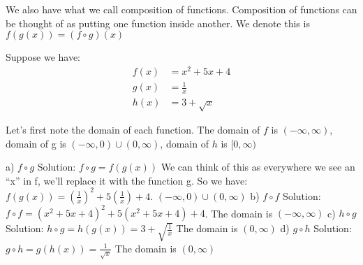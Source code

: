 \documentclass{ximera}
\begin{document}
We also have what we call composition of functions.  Composition of
functions can be thought of as putting one function inside another.
We denote this is $f(g(x))=(f\circ g)(x)$

\begin{example}
 Suppose we have:
\begin{align*}
  f(x)&={{x}^{2}}+5x+4 \\ 
  g(x)&=\frac{1}{x} \\ 
  h(x)&=3+\sqrt{x}
\end{align*}

Let’s first note the domain of each function.  The domain of $f$
is $(-\infty ,\infty )$, domain of g is $(-\infty ,0)\cup (0,\infty )$,
domain of $h$ is $[0,\infty )$
 
a)	$f\circ g$ 
Solution: $f\circ g=f(g(x))$ We can think of this as everywhere we see an “x” in f, we’ll replace it with the function g. So we have: $f(g(x))={{\left( \frac{1}{x} \right)}^{2}}+5\left( \frac{1}{x} \right)+4$.  $(-\infty ,0)\cup (0,\infty )$
b)	$f\circ f$ 
Solution: $f\circ f={{\left( {{x}^{2}}+5x+4 \right)}^{2}}+5\left( {{x}^{2}}+5x+4 \right)+4$.  The domain is $(-\infty ,\infty )$
c)	$h\circ g$  
Solution: $h\circ g=h(g(x))=3+\sqrt{\frac{1}{x}}$ The domain is $(0,\infty )$
d)	$g\circ h$ 
Solution:$g\circ h=g(h(x))=\frac{1}{\sqrt{x}}$ The domain is $(0,\infty )$
\end{example}
\end{document}
